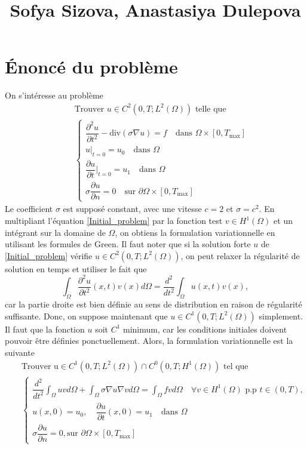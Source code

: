 \documentclass[12pt]{article}
\newcommand{\pd}[2]{ %
	\dfrac{\partial #1}{\partial #2}
}
\begin{document}
	
	\tableofcontents
	\title{Sofya Sizova, Anastasiya Dulepova}
	\maketitle
	\section{Énoncé du problème}
	On s'intéresse au problème 
	\begin{eqnarray} 
	\nonumber
	& &\text{Trouver } u \in C^2(0, T; L^2(\Omega)) \text{ telle que}\\[2mm]
	& &\begin{cases} \label{Initial_problem}
	\dfrac{\partial^2u}{\partial t^2} - \text{div} (\sigma\nabla u) = f \quad  \text{dans } \Omega \times [0, T_\text{max}]\\
	u|_{t = 0} = u_0 \quad \text{dans } \Omega \\
	\pd{u}{t}|_{t = 0} = u_1 \quad \text{dans } \Omega \\
	\sigma \pd{u}{n} = 0 \quad \text{sur } \partial\Omega \times [0, T_\text{max}]
	\end{cases}
	\end{eqnarray}
Le coefficient $\sigma$ est supposé constant, avec une vitesse $c = 2$ et $\sigma = c^2$. 
En multipliant l'équation \eqref{Initial_problem} par la fonction test $v \in H^1(\Omega)$ et un intégrant sur la domaine de $\Omega$, on obtiens la formulation variationnelle en utilisant les formules de Green. Il faut noter que si la solution forte $u$ de \eqref{Initial_problem} vérifie $u \in C^2(0, T; L^2(\Omega))$, on peut relaxer la régularité de solution en temps et utiliser le fait que
\begin{equation*}
\int_\Omega{\dfrac{\partial^2u}{\partial t^2}(x,t) v(x)d\Omega} = \frac{d^2}{dt^2} \int_\Omega{u(x,t) v(x)},
\end{equation*}
car la partie droite est bien définie au sens de distribution en raison de régularité suffisante. Donc, on suppose maintenant que $u \in C^1(0, T; L^2(\Omega))$ simplement. Il faut que la fonction $u$ soit $C^1$ minimum, car les conditions initiales doivent pouvoir être définies ponctuellement.  Alors, la formulation variationnelle est la suivante
\begin{eqnarray}
\nonumber
& &\text{Trouver u} \in C^1(0, T; L^2(\Omega)) \cap C^0(0, T; H^1(\Omega)) \text { tel que}\\
& &\begin{cases} \nonumber
\dfrac{d^2}{dt^2} \int_\Omega {u v d\Omega} + \int_\Omega{\sigma \nabla u \nabla v d\Omega} = \int_\Omega{f v d\Omega} \quad \forall v \in H^1(\Omega) \text{ p.p } t \in (0,T),\\
u(x, 0) = u_0, \quad \pd{u}{t}(x,0) = u_1 \quad \text{dans } \Omega \\
\sigma \pd{u}{n} = 0, \text{sur } \partial\Omega \times [0, T_\text{max}]
\end{cases}
\end{eqnarray}
\end{document}

